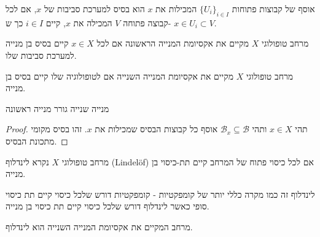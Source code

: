 \documentclass{tstextbook}
\begin{document}
\begin{definition}
אוסף של קבוצות פתוחות \(\{U_i\}_{i \in I}\) המכילות את \(x\) הוא בסיס למערכת סביבות של \(x\), אם לכל קבוצה פתוחה \(V\) המכילה את \(x\), קיים \(i \in I\) כך ש- \(x \in U_i \subset V\).

\end{definition}
\begin{definition}
מרחב טופולוגי \(X\) מקיים את אקסיומת המנייה הראשונה אם לכל \(x \in X\) קיים בסיס בן מנייה למערכת סביבות שלו.

\end{definition}
\begin{definition}
מרחב טופולוגי \(X\) מקיים את אקסיומת המנייה השנייה אם לטופולוגיה שלו קיים בסיס בן מנייה.

\end{definition}
\begin{lemma}
מנייה שנייה גורר מנייה ראשונה

\end{lemma}
\begin{proof}
תהי \(x \in X\) ותהי \(\mathcal{B}_{x}\subseteq \mathcal{B}\) אוסף כל קבוצות הבסיס שמכילות את \(x\). זהו בסיס מקומי מתכונת הבסיס.

\end{proof}
\begin{definition}
מרחב טופולוגי \(X\) נקרא לינדלוף (Lindelöf) אם לכל כיסוי פתוח של המרחב קיים תת-כיסוי בן מנייה.

\end{definition}
\begin{remark}
לינדלוף זה כמו מקרה כללי יותר של קומפקטיות - קומפקטיות דורש שלכל כיסוי קיים תת כיסוי סופי כאשר לינדלוף דורש שלכל כיסוי קיים תת כיסוי בן מנייה.

\end{remark}
\begin{lemma}
מרחב המקיים את אקסיומת המנייה השנייה הוא לינדלוף.

\end{lemma}
\end{document}
